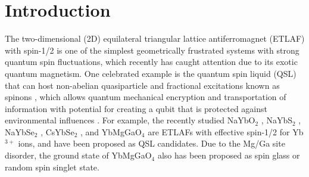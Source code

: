 \documentclass[aps,twocolumn,superscriptaddress,showpacs]{revtex4-1}
\begin{document}

\maketitle

\section{Introduction}

The two-dimensional (2D) equilateral triangular lattice antiferromagnet (ETLAF) with spin-1/2 is one of the simplest geometrically frustrated systems with strong quantum spin fluctuations, which recently has caught attention due to its exotic quantum magnetism. One celebrated example is the quantum spin liquid (QSL) \cite{balents2010spin, savary2016quantum, zhou2017quantum, knolle2019field} that can host non-abelian quasiparticle \cite{nayak2008non} and fractional excitations \cite{han2012fractionalized, punk2014topological} known as spinons \cite{kohno2007spinons, nussinov2007high}, which allows quantum mechanical encryption and transportation of information with potential for creating a qubit that is protected against environmental influences \cite{kitaev2006topological}. For example, the recently studied NaYbO$_2$ \cite{bordelon2019field}, NaYbS$_2$ \cite{ma2020spin, PhysRevB.98.220409, PhysRevB.100.241116}, NaYbSe$_2$ \cite{ranjith2019anisotropic, PhysRevB.103.035144, PhysRevX.11.021044}, CsYbSe$_2$ \cite{xing2019field, xie2021}, and YbMgGaO$_4$ \cite{paddison2017continuous, shen2016evidence, li2015gapless, li2017nearest, shen2018fractionalized, li2016muon, li2017spinon, li2017detecting, zhang2018hierarchy} are ETLAFs with effective spin-1/2 for Yb$^{3+}$ ions, and have been proposed as QSL candidates. Due to the Mg/Ga site disorder, the ground state of YbMgGaO$_4$ \cite{xu2016absence, ma2018spin, zhu2017disorder, zhu2018topography, kimchi2018valence, Luo} also has been proposed as spin glass or random spin singlet state.
\end{document}
